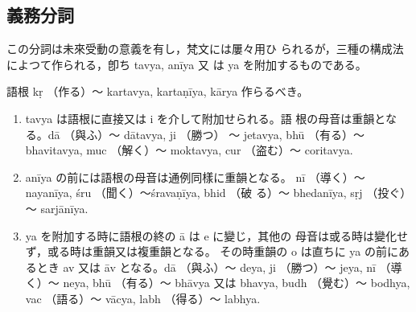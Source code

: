 \subsection{義務分詞}
\numberParagraph
この分詞は未來受動の意義を有し，梵文には屢々用ひ
られるが，三種の構成法によつて作られる，卽ち tavya, anīya 又
は ya を附加するものである。

語根 kṛ （作る）～ kartavya, kartaṇīya, kārya 作らるべき。
\begin{enumerate}[label=(\alph*)]
\item tavya は語根に直接又は i を介して附加せられる。語
根の母音は重韻となる。dā （與ふ）～ dātavya, ji （勝つ）
～ jetavya, bhū （有る）～ bhavitavya, muc （解く）～
moktavya, cur （盗む）～ coritavya.
\item anīya の前には語根の母音は通例同樣に重韻となる。
nī （導く）～ nayanīya, śru （聞く）～śravaṇīya, bhid （破
る）～ bhedanīya, sṛj （投ぐ）～ sarjānīya.
\item ya を附加する時に語根の終の ā は e に變じ，其他の
母音は或る時は變化せず，或る時は重韻又は複重韻となる。
その時重韻の o は直ちに ya の前にあるとき av 又は āv
となる。dā （與ふ）～ deya, ji （勝つ）～ jeya, nī （導く）～
neya, bhū （有る）～ bhāvya 又は bhavya, budh （覺む）～
bodhya, vac （語る）～ vācya, labh （得る）～ labhya.
\end{enumerate}

